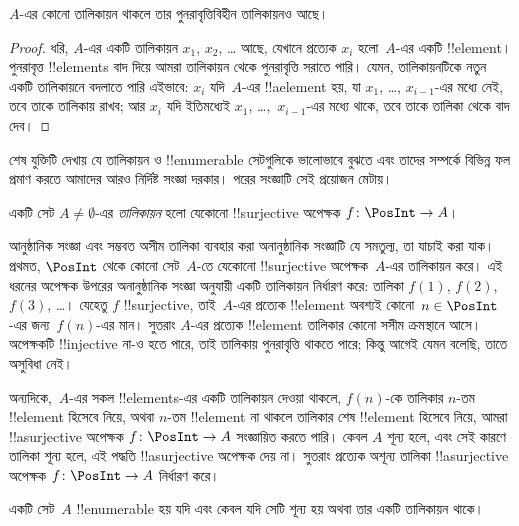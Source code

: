 \documentclass[../../../include/open-logic-section]{subfiles}
\begin{document}
\begin{prop}
  $A$-এর কোনো তালিকায়ন থাকলে তার পুনরাবৃত্তিবিহীন তালিকায়নও আছে।
\end{prop}

\begin{proof}
  ধরি, $A$-এর একটি তালিকায়ন $x_1$, $x_2$, \dots{} আছে, যেখানে প্রত্যেক $x_i$ হলো~$A$-এর একটি !!{element}। পুনরাবৃত্ত !!{element}s বাদ দিয়ে আমরা তালিকায়ন থেকে পুনরাবৃত্তি সরাতে পারি। যেমন, তালিকায়নটিকে নতুন একটি তালিকায়নে বদলাতে পারি এইভাবে: $x_i$ যদি~$A$-এর !!a{element} হয়, যা $x_1$, \dots, $x_{i-1}$-এর মধ্যে নেই, তবে তাকে তালিকায় রাখব; আর $x_i$ যদি ইতিমধ্যেই $x_1$, \dots,~$x_{i-1}$-এর মধ্যে থাকে, তবে তাকে তালিকা থেকে বাদ দেব।
\end{proof}

শেষ যুক্তিটি দেখায় যে তালিকায়ন ও !!{enumerable} সেটগুলিকে ভালোভাবে বুঝতে এবং তাদের সম্পর্কে বিভিন্ন ফল প্রমাণ করতে আমাদের আরও নির্দিষ্ট সংজ্ঞা দরকার। পরের সংজ্ঞাটি সেই প্রয়োজন মেটায়।

\begin{defn}[তালিকায়ন, আনুষ্ঠানিকভাবে]
একটি সেট $A \neq \emptyset$-এর \emph{তালিকায়ন} হলো যেকোনো !!{surjective} অপেক্ষক $f \colon \PosInt \to A$।
\end{defn}

\begin{explain}
আনুষ্ঠানিক সংজ্ঞা এবং সম্ভবত অসীম তালিকা ব্যবহার করা অনানুষ্ঠানিক সংজ্ঞাটি যে সমতুল্য, তা যাচাই করা যাক। প্রথমত, $\PosInt$ থেকে কোনো সেট~$A$-তে যেকোনো !!{surjective} অপেক্ষক~$A$-এর তালিকায়ন করে। এই ধরনের অপেক্ষক উপরের অনানুষ্ঠানিক সংজ্ঞা অনুযায়ী একটি তালিকায়ন নির্ধারণ করে: তালিকা $f(1)$, $f(2)$, $f(3)$, \dots। যেহেতু $f$ !!{surjective}, তাই~$A$-এর প্রত্যেক !!{element} অবশ্যই কোনো~$n \in \PosInt$-এর জন্য~$f(n)$-এর মান। সুতরাং $A$-এর প্রত্যেক !!{element} তালিকার কোনো সসীম ক্রমস্থানে আসে। অপেক্ষকটি !!{injective} না-ও হতে পারে, তাই তালিকায় পুনরাবৃত্তি থাকতে পারে; কিন্তু আগেই যেমন বলেছি, তাতে অসুবিধা নেই।

অন্যদিকে,~$A$-এর সকল !!{element}s-এর একটি তালিকায়ন দেওয়া থাকলে, $f(n)$-কে তালিকার $n$-তম !!{element} হিসেবে নিয়ে, অথবা $n$-তম !!{element} না থাকলে তালিকার শেষ !!{element} হিসেবে নিয়ে, আমরা !!a{surjective} অপেক্ষক $f\colon \PosInt \to A$ সংজ্ঞায়িত করতে পারি। কেবল $A$ শূন্য হলে, এবং সেই কারণে তালিকা শূন্য হলে, এই পদ্ধতি !!a{surjective} অপেক্ষক দেয় না। সুতরাং প্রত্যেক অশূন্য তালিকা !!a{surjective} অপেক্ষক $f\colon \PosInt \to A$ নির্ধারণ করে।
\end{explain}

\begin{defn}
  একটি সেট~$A$ !!{enumerable} হয় যদি এবং কেবল যদি সেটি শূন্য হয় অথবা তার একটি তালিকায়ন থাকে।
\end{defn}
\end{document}
